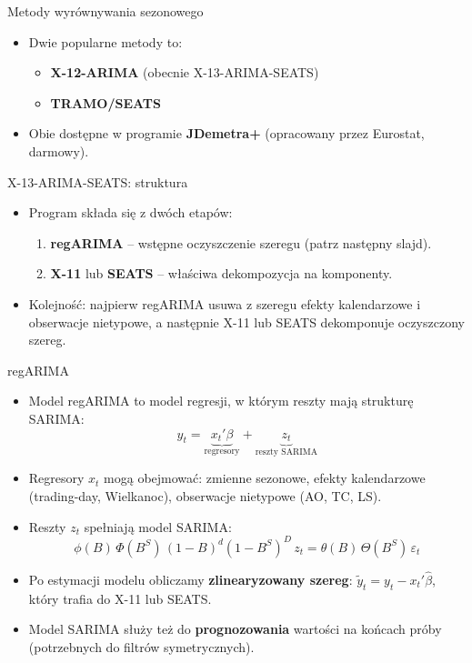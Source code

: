 \documentclass[11pt,usenames,dvipsnames,aspectratio=169]{beamer}
\begin{document}
\begin{frame}{Metody wyrównywania sezonowego}
\begin{itemize}
    \item Dwie popularne metody to:
    \begin{itemize}
        \item \textbf{X-12-ARIMA} (obecnie X-13-ARIMA-SEATS)
        \item \textbf{TRAMO/SEATS}
    \end{itemize}
    \item Obie dostępne w programie \textbf{JDemetra+} (opracowany przez Eurostat, darmowy).
\end{itemize}
\end{frame}

\begin{frame}{X-13-ARIMA-SEATS: struktura}
\begin{itemize}
    \item Program składa się z dwóch etapów:
    \begin{enumerate}
        \item \textbf{regARIMA} -- wstępne oczyszczenie szeregu (patrz następny slajd).
        \item \textbf{X-11} lub \textbf{SEATS} -- właściwa dekompozycja na komponenty.
    \end{enumerate}
    \item Kolejność: najpierw regARIMA usuwa z szeregu efekty kalendarzowe i obserwacje nietypowe, a następnie X-11 lub SEATS dekomponuje oczyszczony szereg.
\end{itemize}
\end{frame}

\begin{frame}{regARIMA}
\begin{itemize}
    \item Model regARIMA to model regresji, w którym reszty mają strukturę SARIMA:
    \[
    y_t = \underbrace{x_t'\beta}_{\text{regresory}} + \underbrace{z_t}_{\text{reszty SARIMA}}
    \]
    \item Regresory $x_t$ mogą obejmować: zmienne sezonowe, efekty kalendarzowe (trading-day, Wielkanoc), obserwacje nietypowe (AO, TC, LS).
    \item Reszty $z_t$ spełniają model SARIMA:
    \[
    \phi(B)\,\Phi(B^S)\,(1-B)^d(1-B^S)^D\, z_t = \theta(B)\,\Theta(B^S)\,\varepsilon_t
    \]
    \item Po estymacji modelu obliczamy \textbf{zlinearyzowany szereg}: $\tilde{y}_t = y_t - x_t'\hat{\beta}$, który trafia do X-11 lub SEATS.
    \item Model SARIMA służy też do \textbf{prognozowania} wartości na końcach próby (potrzebnych do filtrów symetrycznych).
\end{itemize}
\end{frame}
\end{document}

